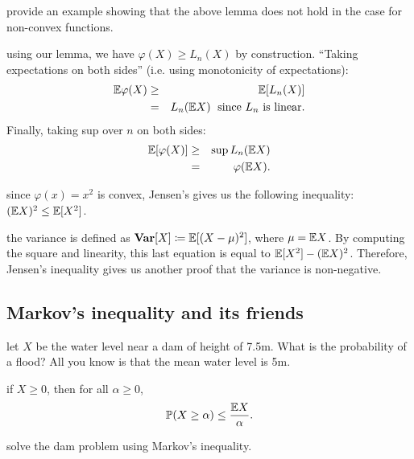 \documentclass{article}
\begin{document}
 provide an example showing that the above lemma does not hold in the case for non-convex functions.

 using our lemma, we have $\varphi(X) \ge L_n(X)$ by construction. ``Taking expectations on both sides'' (i.e. using monotonicity of expectations):
\begin{eqnarray}
{\mathbb E}\varphi(X) &\ge& {\mathbb E}[L_n(X)] \\
&=& L_n({\mathbb E} X) \;\text{ since }L_n\text{ is linear.}
\end{eqnarray}
Finally, taking sup over $n$ on both sides:
\begin{eqnarray}
{\mathbb E}[\varphi(X)] &\ge& \sup L_n({\mathbb E} X) \\ 
&=& \varphi({\mathbb E} X).
\end{eqnarray}

 since $\varphi(x) = x^2$ is convex, Jensen's gives us the following inequality: $({\mathbb E} X)^2 \le {\mathbb E}[X^2]$.

 the variance is defined as ${\text {\bf Var}}[X] \coloneqq {\mathbb E}[(X - \mu)^2]$, where $\mu = {\mathbb E} X$. By computing the square and linearity, this last equation is equal to ${\mathbb E}[X^2] - ({\mathbb E} X)^2$.  Therefore, Jensen's inequality gives us another proof that the variance is non-negative.


\subsection{Markov's inequality and its friends}\label{sec:markov}

 let $X$ be the water level near a dam of height of 7.5m. What is the probability of a flood? All you know is that the mean water level is 5m.

 if $X \ge 0$, then for all $\alpha \ge 0$, 
\[ {\mathbb P}( X \ge \alpha) \le \frac{{\mathbb E} X}{\alpha}. \]

 solve the dam problem using Markov's inequality.
\end{document}
